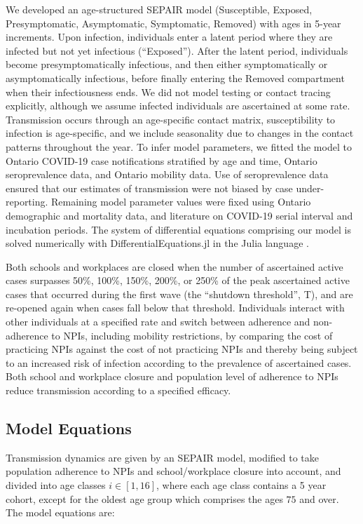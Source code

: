 We developed an age-structured SEPAIR model (Susceptible, Exposed, Presymptomatic, Asymptomatic, Symptomatic, Removed) with ages in 5-year increments. Upon infection, individuals enter a latent period where they are infected but not yet infectious (“Exposed”).  After the latent period, individuals become presymptomatically infectious, and then either symptomatically or asymptomatically infectious, before finally entering the Removed compartment when their infectiousness ends. We did not model testing or contact tracing explicitly, although we assume infected individuals are ascertained at some rate. Transmission occurs through an age-specific contact matrix, susceptibility to infection is age-specific, and we include seasonality due to changes in the contact patterns throughout the year.  To infer model parameters, we fitted the model to Ontario COVID-19 case notifications stratified by age and time, Ontario seroprevalence data, and Ontario mobility data.  Use of seroprevalence data ensured that our estimates of transmission were not biased by case under-reporting. Remaining model parameter values were fixed using Ontario demographic and mortality data, and literature on COVID-19 serial interval and incubation periods. The system of differential equations comprising our model is solved numerically with DifferentialEquations.jl in the Julia language \cite{rackauckas2017differentialequations}.

Both schools and workplaces are closed when the number of ascertained active cases surpasses 50\%, 100\%, 150\%, 200\%, or 250\% of the peak ascertained active cases that occurred during the first wave (the “shutdown threshold”, T), and are re-opened again when cases fall below that threshold. Individuals interact with other individuals at a specified rate and switch between adherence and non-adherence to NPIs, including mobility restrictions, by comparing the cost of practicing NPIs against the cost of not practicing NPIs and thereby being subject to an increased risk of infection according to the prevalence of ascertained cases.  Both school and workplace closure and population level of adherence to NPIs reduce transmission according to a specified efficacy. 



\subsection{Model Equations}
 
Transmission dynamics are given by an SEPAIR model, modified to take population adherence to NPIs and school/workplace closure into account, and divided into age classes $i \in [1,16]$, where each age class contains a 5 year cohort, except for the oldest age group which comprises the ages $75$ and over. The model equations are:

